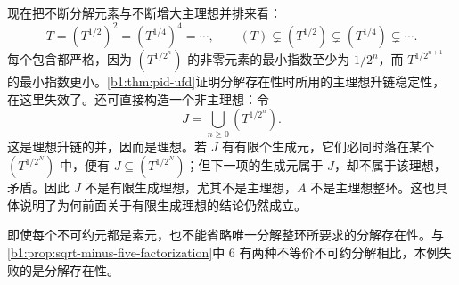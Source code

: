 \begin{solution}
	现在把不断分解元素与不断增大主理想并排来看：
	\[
		T=(T^{1/2})^2=(T^{1/4})^4=\cdots, \qquad (T)\subsetneq(T^{1/2})\subsetneq(T^{1/4})\subsetneq\cdots.
	\]
	每个包含都严格，因为 \((T^{1/2^n})\) 的非零元素的最小指数至少为 \(1/2^n\)，而 \(T^{1/2^{n+1}}\) 的最小指数更小。\cref{b1:thm:pid-ufd}证明分解存在性时所用的主理想升链稳定性，在这里失效了。还可直接构造一个非主理想：令
	\[
		J=\bigcup_{n\geq0}(T^{1/2^n}).
	\]
	这是理想升链的并，因而是理想。若 \(J\) 有有限个生成元，它们必同时落在某个 \((T^{1/2^N})\) 中，便有 \(J\subseteq(T^{1/2^N})\)；但下一项的生成元属于 \(J\)，却不属于该理想，矛盾。因此 \(J\) 不是有限生成理想，尤其不是主理想，\(A\) 不是主理想整环。这也具体说明了为何前面关于有限生成理想的结论仍然成立。

	即使每个不可约元都是素元，也不能省略唯一分解整环所要求的分解存在性。与\cref{b1:prop:sqrt-minus-five-factorization}中 \(6\) 有两种不等价不可约分解相比，本例失败的是分解存在性。
\end{solution}

